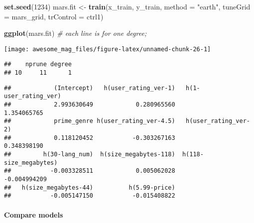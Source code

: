 \documentclass[]{article}
\newenvironment{Shaded}{\begin{snugshade}}{\end{snugshade}}
\newcommand{\KeywordTok}[1]{\textcolor[rgb]{0.13,0.29,0.53}{\textbf{#1}}}
\newcommand{\DataTypeTok}[1]{\textcolor[rgb]{0.13,0.29,0.53}{#1}}
\newcommand{\DecValTok}[1]{\textcolor[rgb]{0.00,0.00,0.81}{#1}}
\newcommand{\StringTok}[1]{\textcolor[rgb]{0.31,0.60,0.02}{#1}}
\newcommand{\CommentTok}[1]{\textcolor[rgb]{0.56,0.35,0.01}{\textit{#1}}}
\newcommand{\OperatorTok}[1]{\textcolor[rgb]{0.81,0.36,0.00}{\textbf{#1}}}
\newcommand{\NormalTok}[1]{#1}
\let\oldparagraph\paragraph
\renewcommand{\paragraph}[1]{\oldparagraph{#1}\mbox{}}
\begin{document}
\begin{Shaded}
\begin{Highlighting}[]
\KeywordTok{set.seed}\NormalTok{(}\DecValTok{1234}\NormalTok{)}
\NormalTok{mars.fit <-}\StringTok{ }\KeywordTok{train}\NormalTok{(x_train, y_train,}
                 \DataTypeTok{method =} \StringTok{"earth"}\NormalTok{,}
                 \DataTypeTok{tuneGrid =}\NormalTok{ mars_grid,}
                 \DataTypeTok{trControl =}\NormalTok{ ctrl1)}

\KeywordTok{ggplot}\NormalTok{(mars.fit) }\CommentTok{# each line is for one degree;}
\end{Highlighting}
\end{Shaded}

\texttt{[image: awesome\_mag\_files/figure-latex/unnamed-chunk-26-1]}

\begin{Shaded}
\end{Shaded}

\begin{verbatim}
##    nprune degree
## 10     11      1
\end{verbatim}

\begin{Shaded}
\end{Shaded}

\begin{verbatim}
##            (Intercept)   h(user_rating_ver-1)   h(1-user_rating_ver) 
##            2.993630649            0.280965560            1.354065765 
##            prime_genre h(user_rating_ver-4.5)   h(user_rating_ver-2) 
##            0.118120452           -0.303267163            0.348398190 
##         h(30-lang_num)  h(size_megabytes-118)  h(118-size_megabytes) 
##           -0.003328511            0.005062028           -0.004994209 
##   h(size_megabytes-44)          h(5.99-price) 
##           -0.005147150           -0.015408822
\end{verbatim}

\paragraph{Compare models}\label{compare-models}
\end{document}
